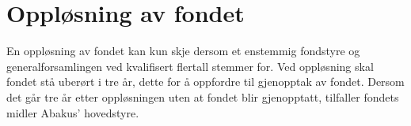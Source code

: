 \section{Oppløsning av fondet}
En oppløsning av fondet kan kun skje dersom et enstemmig fondstyre og
generalforsamlingen ved kvalifisert flertall stemmer for. Ved oppløsning skal
fondet stå uberørt i tre år, dette for å oppfordre til gjenopptak av fondet.
Dersom det går tre år etter oppløsningen uten at fondet blir gjenopptatt,
tilfaller fondets midler Abakus' hovedstyre.
